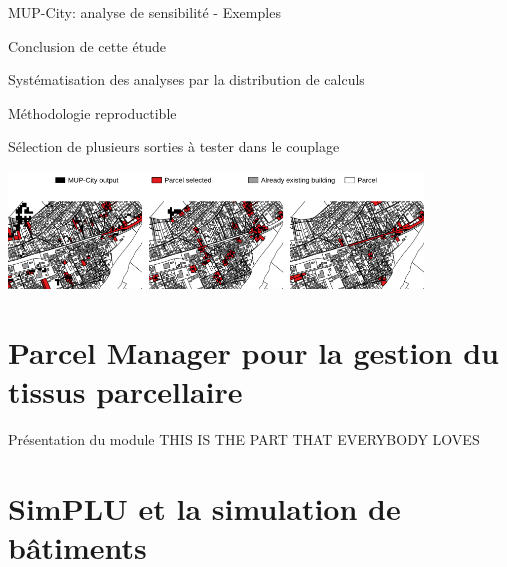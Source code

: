 \documentclass[xcolor=table]{beamer}
\begin{document}
\begin{frame}{MUP-City: analyse de sensibilité - Exemples}

\end{frame}

\begin{frame}{Conclusion de cette étude}
	\begin{description}
		\item Systématisation des analyses par la distribution de calculs
		\item Méthodologie reproductible
		\item Sélection de plusieurs sorties à tester dans le couplage\\
	\end{description}
	\begin{block}{}\centering\includegraphics[width=11cm]{Images/exMup.png}\end{block}	
\end{frame}


\section[Parcel Manager]{Parcel Manager pour la gestion du tissus parcellaire}

\begin{frame}{Présentation du module}
THIS IS THE PART THAT EVERYBODY LOVES
\end{frame}




\section[SimPLU]{SimPLU et la simulation de bâtiments}
\end{document}
